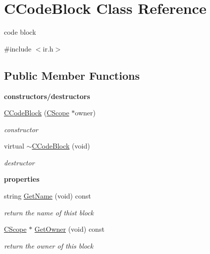 \hypertarget{classCCodeBlock}{\section{C\-Code\-Block Class Reference}
\label{classCCodeBlock}
}


code block  




{\ttfamily \#include $<$ir.\-h$>$}

\subsection*{Public Member Functions}
\begin{Indent}{\bf constructors/destructors}\par
\begin{DoxyCompactItemize}
\item 
\hyperlink{classCCodeBlock_a9a9f57d9648052aa8e317be643b9a752}{C\-Code\-Block} (\hyperlink{classCScope}{C\-Scope} $\ast$owner)
\begin{DoxyCompactList}\small\item\em constructor \end{DoxyCompactList}\item 
\hypertarget{classCCodeBlock_a51ad3092538f0d9d179453871c7bdbeb}{virtual \hyperlink{classCCodeBlock_a51ad3092538f0d9d179453871c7bdbeb}{$\sim$\-C\-Code\-Block} (void)}\label{classCCodeBlock_a51ad3092538f0d9d179453871c7bdbeb}

\begin{DoxyCompactList}\small\item\em destructor \end{DoxyCompactList}\end{DoxyCompactItemize}
\end{Indent}
\begin{Indent}{\bf properties}\par
\begin{DoxyCompactItemize}
\item 
\hypertarget{classCCodeBlock_a3d41f2e936bedcd723ee0bea55b46ef3}{string \hyperlink{classCCodeBlock_a3d41f2e936bedcd723ee0bea55b46ef3}{Get\-Name} (void) const }\label{classCCodeBlock_a3d41f2e936bedcd723ee0bea55b46ef3}

\begin{DoxyCompactList}\small\item\em return the name of thist block \end{DoxyCompactList}\item 
\hypertarget{classCCodeBlock_ad0176cbb6713cf88df0c6e090aa6a322}{\hyperlink{classCScope}{C\-Scope} $\ast$ \hyperlink{classCCodeBlock_ad0176cbb6713cf88df0c6e090aa6a322}{Get\-Owner} (void) const }\label{classCCodeBlock_ad0176cbb6713cf88df0c6e090aa6a322}

\begin{DoxyCompactList}\small\item\em return the owner of this block \end{DoxyCompactList}\end{DoxyCompactItemize}
\end{Indent}

